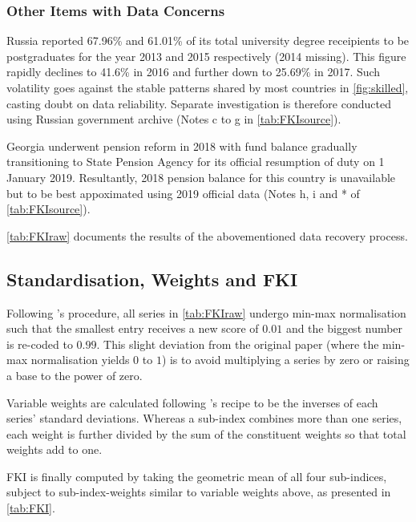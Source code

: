 \documentclass[a4paper,11pt,UKenglish,twoside,openright]{report}\usepackage[]{graphicx}\usepackage[]{color}
\begin{document}


\subsubsection{Other Items with Data Concerns}

Russia reported 67.96\% and 61.01\% of its total university degree receipients to be postgraduates for the year 2013 and 2015 respectively (2014 missing). This figure rapidly declines to 41.6\% in 2016 and further down to 25.69\% in 2017. Such volatility goes against the stable patterns shared by most countries in \cref{fig:skilled}, casting doubt on data reliability. Separate investigation is therefore conducted using Russian government archive (Notes c to g in \cref{tab:FKIsource}).

Georgia underwent pension reform in 2018 with fund balance gradually transitioning to State Pension Agency for its official resumption of duty on 1 January 2019. Resultantly, 2018 pension balance for this country is unavailable but to be best appoximated using 2019 official data (Notes h, i and * of \cref{tab:FKIsource}).

\cref{tab:FKIraw} documents the results of the abovementioned data recovery process.

\subsection{Standardisation, Weights and FKI}

Following \textcite{olivermarquez:2020}'s procedure, all series in \cref{tab:FKIraw} undergo min-max normalisation such that the smallest entry receives a new score of $0.01$ and the biggest number is re-coded to $0.99$. This slight deviation from the original paper (where the min-max normalisation yields $0$ to $1$) is to avoid multiplying a series by zero or raising a base to the power of zero.

Variable weights are calculated following \textcite{olivermarquez:2020}'s recipe to be the inverses of each series' standard deviations. Whereas a sub-index combines more than one series, each weight is further divided by the sum of the constituent weights so that total weights add to one.

FKI is finally computed by taking the geometric mean of all four sub-indices, subject to sub-index-weights similar to variable weights above, as presented in \cref{tab:FKI}.


\end{document}
